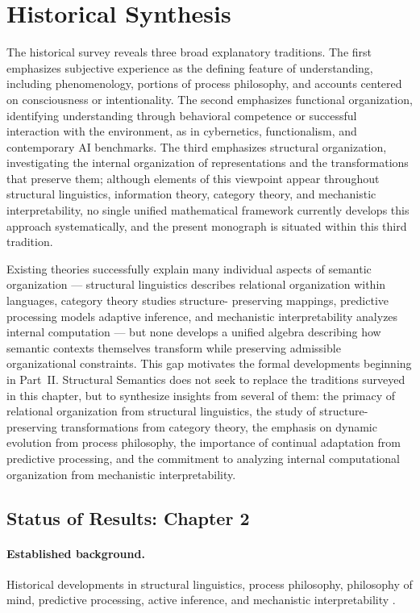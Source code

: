 \documentclass[11pt,twoside,openright]{book}
\numberwithin{equation}{chapter}
\theoremstyle{definition}
\theoremstyle{plain}
\theoremstyle{remark}
\theoremstyle{definition}
\begin{document}
\section{Historical Synthesis}

The historical survey reveals three broad explanatory traditions. The
first emphasizes subjective experience as the defining feature of
understanding, including phenomenology, portions of process philosophy,
and accounts centered on consciousness or intentionality. The second
emphasizes functional organization, identifying understanding through
behavioral competence or successful interaction with the environment, as
in cybernetics, functionalism, and contemporary AI benchmarks. The third
emphasizes structural organization, investigating the internal
organization of representations and the transformations that preserve
them; although elements of this viewpoint appear throughout structural
linguistics, information theory, category theory, and mechanistic
interpretability, no single unified mathematical framework currently
develops this approach systematically, and the present monograph is
situated within this third tradition.

Existing theories successfully explain many individual aspects of
semantic organization --- structural linguistics describes relational
organization within languages, category theory studies structure-
preserving mappings, predictive processing models adaptive inference, and
mechanistic interpretability analyzes internal computation --- but none
develops a unified algebra describing how semantic contexts themselves
transform while preserving admissible organizational constraints. This
gap motivates the formal developments beginning in Part~II. Structural
Semantics does not seek to replace the traditions surveyed in this
chapter, but to synthesize insights from several of them: the primacy of
relational organization from structural linguistics, the study of
structure-preserving transformations from category theory, the emphasis
on dynamic evolution from process philosophy, the importance of continual
adaptation from predictive processing, and the commitment to analyzing
internal computational organization from mechanistic interpretability.

\subsection*{Status of Results: Chapter 2}

\paragraph{Established background.} Historical developments in structural
linguistics, process philosophy, philosophy of mind, predictive
processing, active inference, and mechanistic interpretability
\cite{Saussure1916,Trier1931,Lyons1977,Whitehead1929,Searle1980,Block1995,
Clark2013,Friston2010,Vaswani2017,Elhage2021,Nanda2023}.
\end{document}
